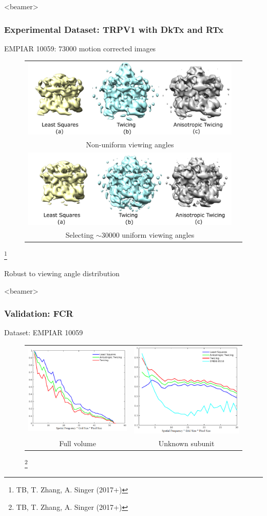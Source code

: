 \documentclass{beamer}
\newcommand\blfootnote[1]{%
  \begingroup
  \renewcommand\thefootnote{}\footnote{#1}%
  \addtocounter{footnote}{-1}%
  \endgroup
}
\begin{document}
\begin{frame}<beamer>
\frametitle{Experimental Dataset: TRPV1 with DkTx and RTx }
EMPIAR 10059: $73000$ motion corrected images
\begin{figure}[]
\label{fig:realtrpv}
\centering
\begin{tabular}{cc}
\includegraphics[width=0.5\linewidth]{figures/realdat_unif1.pdf} \\
Non-uniform viewing angles \\ 
\includegraphics[width=0.5\linewidth]{figures/realdat_unif0.pdf}\\
Selecting $\sim 30000$ uniform viewing angles
\end{tabular}
\end{figure}\blfootnote{TB, T. Zhang, A. Singer (2017+)}
\alert{Robust to viewing angle distribution}
\end{frame}


\begin{frame}<beamer>
\frametitle{Validation: FCR }
Dataset: EMPIAR 10059
\begin{figure}[]
\caption{}
\centering
\begin{tabular}{cc}
\includegraphics[width=0.45\linewidth]{figures/realdat_109_fsc.png}
&\includegraphics[width=0.45\linewidth]{figures/realdat_109ball_fsc.png}\\
Full volume & Unknown subunit\\
\end{tabular}\blfootnote{TB, T. Zhang, A. Singer (2017+)}
\end{figure}
\end{frame}
\end{document}
